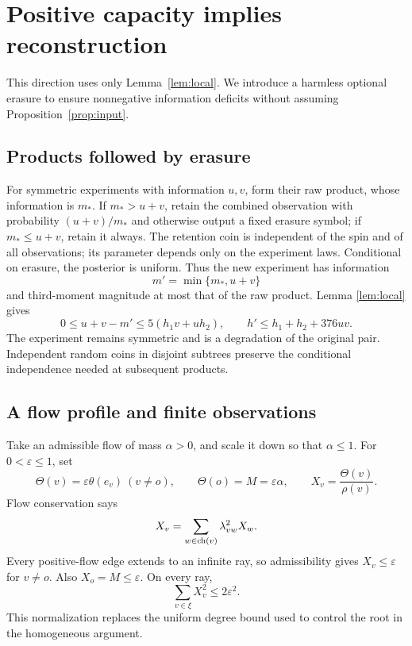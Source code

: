 \section{Positive capacity implies reconstruction}

This direction uses only Lemma~\ref{lem:local}. We introduce a harmless
optional erasure to ensure nonnegative information deficits without
assuming Proposition~\ref{prop:input}.

\subsection{Products followed by erasure}

For symmetric experiments with information $u,v$, form their raw product,
whose information is $m_*$. If $m_*>u+v$, retain the combined observation
with probability $(u+v)/m_*$ and otherwise output a fixed erasure symbol;
if $m_*\le u+v$, retain it always. The retention coin is independent
of the spin and of all observations; its parameter depends only on the
experiment laws. Conditional on erasure, the posterior is uniform.
Thus the new experiment has information
\[
m'=\min\{m_*,u+v\}
\]
and third-moment magnitude at most that of the raw product. Lemma
\ref{lem:local} gives
\begin{equation}\label{eq:erasure}
0\le u+v-m'\le5(h_1v+u h_2),\qquad
h'\le h_1+h_2+376uv.
\end{equation}
The experiment remains symmetric and is a degradation of the original
pair. Independent random coins in disjoint subtrees preserve the
conditional independence needed at subsequent products.

\subsection{A flow profile and finite observations}

Take an admissible flow of mass $\alpha>0$, and scale it down so that
$\alpha\le1$. For $0<\varepsilon\le1$, set
\[
\Theta(v)=\varepsilon\theta(e_v)\ (v\ne o),\qquad
\Theta(o)=M=\varepsilon\alpha,\qquad
X_v=\frac{\Theta(v)}{\rho(v)}.
\]
Flow conservation says
\begin{equation}\label{eq:profile}
X_v=\sum_{w\in\operatorname{ch}(v)}\lambda_{vw}^2X_w.
\end{equation}
Every positive-flow edge extends to an infinite ray, so admissibility
gives $X_v\le\varepsilon$ for $v\ne o$. Also $X_o=M\le\varepsilon$.
On every ray,
\begin{equation}\label{eq:energy}
\sum_{v\in\xi}X_v^2\le2\varepsilon^2.
\end{equation}
This normalization replaces the uniform degree bound used to control
the root in the homogeneous argument.

